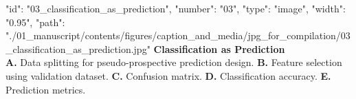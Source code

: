 {
    "id": "03_classification_as_prediction",
    "number": "03",
    "type": "image",
    "width": "0.95\textwidth",
    "path": "./01_manuscript/contents/figures/caption_and_media/jpg_for_compilation/03_classification_as_prediction.jpg"
}
\textbf{Classification as Prediction}\\
\smallskip
\textbf{A.} Data splitting for pseudo-prospective prediction design.
\textbf{B.} Feature selection using validation dataset.
\textbf{C.} Confusion matrix.
\textbf{D.} Classification accuracy.
\textbf{E.} Prediction metrics.
